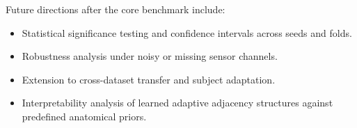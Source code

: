 \documentclass[11pt,a4paper]{article}
\begin{document}

Future directions after the core benchmark include:
\begin{itemize}[leftmargin=*]
  \item Statistical significance testing and confidence intervals across seeds and folds.
  \item Robustness analysis under noisy or missing sensor channels.
  \item Extension to cross-dataset transfer and subject adaptation.
  \item Interpretability analysis of learned adaptive adjacency structures against predefined anatomical priors.
\end{itemize}

\newpage


\end{document}

